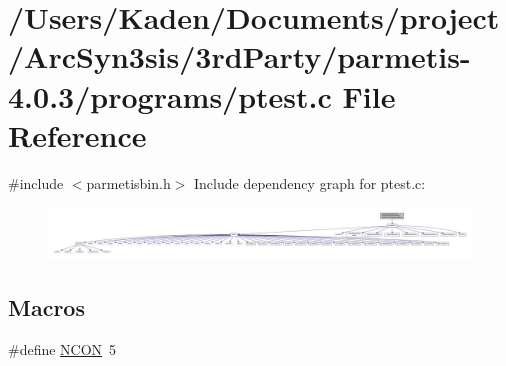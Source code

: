 \hypertarget{a00437}{}\section{/\+Users/\+Kaden/\+Documents/project/\+Arc\+Syn3sis/3rd\+Party/parmetis-\/4.0.3/programs/ptest.c File Reference}
\label{a00437}
{\ttfamily \#include $<$parmetisbin.\+h$>$}\newline
Include dependency graph for ptest.\+c\+:\nopagebreak
\begin{figure}[H]
\begin{center}
\leavevmode
\includegraphics[width=350pt]{a00438}
\end{center}
\end{figure}
\subsection*{Macros}
\begin{DoxyCompactItemize}
\item 
\#define \hyperlink{a00437_a9214dfc9b3f48a9499d9db889783b938}{N\+C\+ON}~5
\end{DoxyCompactItemize}
